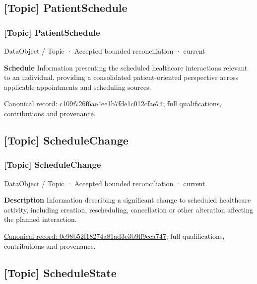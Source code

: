 \subsection{[Topic] PatientSchedule}

\subsubsection{[Topic] PatientSchedule}

\label{element:c109f726f6ae4ee1b7fde1c012cfae74}
{\small DataObject / Topic · Accepted bounded reconciliation · current}\par

\textbf{Schedule}
Information presenting the scheduled healthcare interactions relevant to an individual, providing a consolidated patient-oriented perspective across applicable appointments and scheduling sources.


{\footnotesize \href{../../../../continuum/application/data-object/topic/c109f726f6ae4ee1b7fde1c012cfae74.md}{Canonical record: c109f726f6ae4ee1b7fde1c012cfae74}; full qualifications, contributions and provenance.}\par
\subsection{[Topic] ScheduleChange}

\subsubsection{[Topic] ScheduleChange}

\label{element:0e98b52f18274a81ad3e3b9ff9cca747}
{\small DataObject / Topic · Accepted bounded reconciliation · current}\par

\textbf{Description}
Information describing a significant change to scheduled healthcare activity, including creation, rescheduling, cancellation or other alteration affecting the planned interaction.


{\footnotesize \href{../../../../continuum/application/data-object/topic/0e98b52f18274a81ad3e3b9ff9cca747.md}{Canonical record: 0e98b52f18274a81ad3e3b9ff9cca747}; full qualifications, contributions and provenance.}\par
\subsection{[Topic] ScheduleState}

